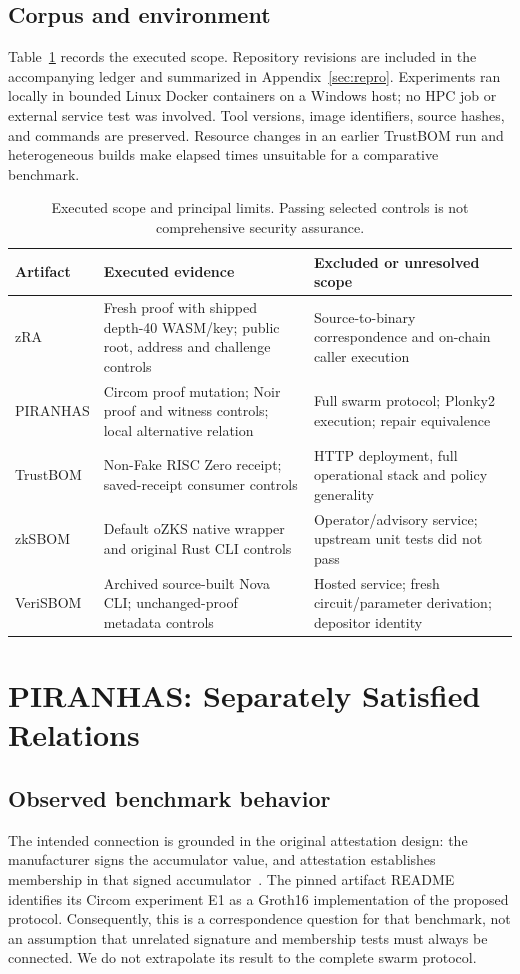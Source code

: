 \documentclass[sigconf,nonacm]{acmart}
\begin{document}
\subsection{Corpus and environment}
Table~\ref{tab:corpus} records the executed scope. Repository revisions are included in the accompanying ledger and summarized in Appendix~\ref{sec:repro}. Experiments ran locally in bounded Linux Docker containers on a Windows host; no HPC job or external service test was involved. Tool versions, image identifiers, source hashes, and commands are preserved. Resource changes in an earlier TrustBOM run and heterogeneous builds make elapsed times unsuitable for a comparative benchmark.

\begin{table}[t]
\caption{Executed scope and principal limits. Passing selected controls is not comprehensive security assurance.}
\label{tab:corpus}
\small
\begin{tabularx}{\textwidth}{@{}lXX@{}}
\toprule Artifact & Executed evidence & Excluded or unresolved scope \\
\midrule
zRA & Fresh proof with shipped depth-40 WASM/key; public root, address and challenge controls & Source-to-binary correspondence and on-chain caller execution \\
PIRANHAS & Circom proof mutation; Noir proof and witness controls; local alternative relation & Full swarm protocol; Plonky2 execution; repair equivalence \\
TrustBOM & Non-Fake RISC Zero receipt; saved-receipt consumer controls & HTTP deployment, full operational stack and policy generality \\
zkSBOM & Default oZKS native wrapper and original Rust CLI controls & Operator/advisory service; upstream unit tests did not pass \\
VeriSBOM & Archived source-built Nova CLI; unchanged-proof metadata controls & Hosted service; fresh circuit/parameter derivation; depositor identity \\
\bottomrule
\end{tabularx}
\end{table}

\section{PIRANHAS: Separately Satisfied Relations}
\subsection{Observed benchmark behavior}
The intended connection is grounded in the original attestation design: the manufacturer signs the accumulator value, and attestation establishes membership in that signed accumulator~\cite{piranhas}. The pinned artifact README identifies its Circom experiment E1 as a Groth16 implementation of the proposed protocol. Consequently, this is a correspondence question for that benchmark, not an assumption that unrelated signature and membership tests must always be connected. We do not extrapolate its result to the complete swarm protocol.
\end{document}
